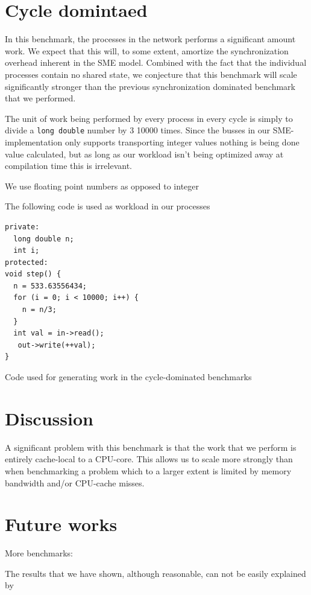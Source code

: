 \section{Cycle domintaed}
In this benchmark, the processes in the network performs a significant
amount work. We expect that this will, to some extent, amortize the
synchronization overhead inherent in the SME model. Combined with the
fact that the individual processes contain no shared state, we
conjecture that this benchmark will scale significantly stronger
than the previous synchronization dominated benchmark that we
performed.

The unit of work being performed by every process in every cycle is
simply to divide a \texttt{long double} number by 3 10000 times. Since
the busses in our SME-implementation only supports transporting
integer values nothing is being done value calculated, but as long as
our workload isn't being optimized away at compilation time this is
irrelevant.

We use floating point numbers as opposed to integer

The following code is used as workload in our processes
\begin{listing}[H]
\begin{verbatim}
private:
  long double n;
  int i;
protected:
void step() {
  n = 533.63556434;
  for (i = 0; i < 10000; i++) {
    n = n/3;
  }
  int val = in->read();
   out->write(++val);
}
\end{verbatim}
\caption{Code used for generating work in the cycle-dominated
  benchmarks}
\label{lst:cyclecode}
\end{listing}


\section{Discussion}
A significant problem with this benchmark is that the work that we
perform is entirely cache-local to a CPU-core. This allows us to scale
more strongly than when benchmarking a problem which to a larger
extent is limited by memory bandwidth and/or CPU-cache misses. 



\section{Future works}

More benchmarks:


The results that we have shown, although reasonable, can not be easily
explained by 

